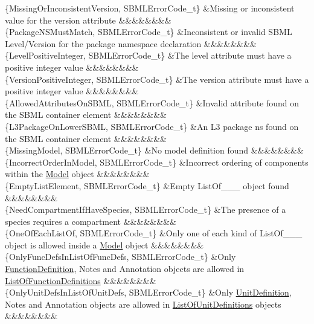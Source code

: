 \begin{DoxyParagraph}{}
\begin{longtabu}
\{Missing\+Or\+Inconsistent\+Version, S\+B\+M\+L\+Error\+Code\+\_\+t\} &Missing or inconsistent value for the \textquotesingle{}version\textquotesingle{} attribute &&&&&&&&\\
\{Package\+N\+S\+Must\+Match, S\+B\+M\+L\+Error\+Code\+\_\+t\} &Inconsistent or invalid S\+B\+ML Level/\+Version for the package namespace declaration &&&&&&&&\\
\{Level\+Positive\+Integer, S\+B\+M\+L\+Error\+Code\+\_\+t\} &The \textquotesingle{}level\textquotesingle{} attribute must have a positive integer value &&&&&&&&\\
\{Version\+Positive\+Integer, S\+B\+M\+L\+Error\+Code\+\_\+t\} &The \textquotesingle{}version\textquotesingle{} attribute must have a positive integer value &&&&&&&&\\
\{Allowed\+Attributes\+On\+S\+B\+ML, S\+B\+M\+L\+Error\+Code\+\_\+t\} &Invalid attribute found on the S\+B\+ML container element &&&&&&&&\\
\{L3\+Package\+On\+Lower\+S\+B\+ML, S\+B\+M\+L\+Error\+Code\+\_\+t\} &An L3 package ns found on the S\+B\+ML container element &&&&&&&&\\
\{Missing\+Model, S\+B\+M\+L\+Error\+Code\+\_\+t\} &No model definition found &&&&&&&&\\
\{Incorrect\+Order\+In\+Model, S\+B\+M\+L\+Error\+Code\+\_\+t\} &Incorrect ordering of components within the \hyperlink{class_model}{Model} object &&&&&&&&\\
\{Empty\+List\+Element, S\+B\+M\+L\+Error\+Code\+\_\+t\} &Empty List\+Of\+\_\+\+\_\+\+\_\+ object found &&&&&&&&\\
\{Need\+Compartment\+If\+Have\+Species, S\+B\+M\+L\+Error\+Code\+\_\+t\} &The presence of a species requires a compartment &&&&&&&&\\
\{One\+Of\+Each\+List\+Of, S\+B\+M\+L\+Error\+Code\+\_\+t\} &Only one of each kind of List\+Of\+\_\+\+\_\+\+\_\+ object is allowed inside a \hyperlink{class_model}{Model} object &&&&&&&&\\
\{Only\+Func\+Defs\+In\+List\+Of\+Func\+Defs, S\+B\+M\+L\+Error\+Code\+\_\+t\} &Only \hyperlink{class_function_definition}{Function\+Definition}, Notes and Annotation objects are allowed in \hyperlink{class_list_of_function_definitions}{List\+Of\+Function\+Definitions} &&&&&&&&\\
\{Only\+Unit\+Defs\+In\+List\+Of\+Unit\+Defs, S\+B\+M\+L\+Error\+Code\+\_\+t\} &Only \hyperlink{class_unit_definition}{Unit\+Definition}, Notes and Annotation objects are allowed in \hyperlink{class_list_of_unit_definitions}{List\+Of\+Unit\+Definitions} objects &&&&&&&&\\

\end{longtabu}
\end{DoxyParagraph}
